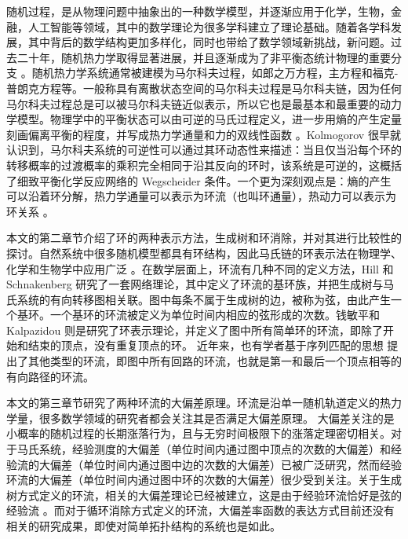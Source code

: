 

随机过程，是从物理问题中抽象出的一种数学模型，并逐渐应用于化学，生物，金融，人工智能等领域，其中的数学理论为很多学科建立了理论基础。随着各学科发展，其中背后的数学结构更加多样化，同时也带给了数学领域新挑战，新问题。过去二十年，随机热力学取得显著进展，并且逐渐成为了非平衡态统计物理的重要分支 \cite{annurev-conmatphys,Seifert_2012,VANDENBROECK20156} 。随机热力学系统通常被建模为马尔科夫过程，如郎之万方程，主方程和福克-普朗克方程等。一般称具有离散状态空间的马尔科夫过程是马尔科夫链，因为任何马尔科夫过程总是可以被马尔科夫链近似表示，所以它也是最基本和最重要的动力学模型。物理学中的平衡状态可以由可逆的马氏过程定义，进一步用熵的产生定量刻画偏离平衡的程度，并写成热力学通量和力的双线性函数 \cite{PhysRev.91.1505}。Kolmogorov \cite{Math.Ann.112} 很早就认识到，马尔科夫系统的可逆性可以通过其环动态性来描述：当且仅当沿每个环的转移概率的过渡概率的乘积完全相同于沿其反向的环时，该系统是可逆的，这概括了细致平衡化学反应网络的 Wegscheider 条件。一个更为深刻观点是：熵的产生可以沿着环分解，热力学通量可以表示为环流（也叫环通量），热动力可以表示为环关系 \cite{Schnakenberg1976NetworkTO}。

本文的第二章节介绍了环的两种表示方法，生成树和环消除，并对其进行比较性的探讨。自然系统中很多随机模型都具有环结构，因此马氏链的环表示法在物理学、化学和生物学中应用广泛 \cite{ZHANG20121,GE201287}。在数学层面上，环流有几种不同的定义方法，Hill \cite{Hill1966StudiesIIa,Hill1966StudiesIIb,hill2013free} 和 Schnakenberg \cite{Schnakenberg1976NetworkTO} 研究了一套网络理论，其中定义了环流的基环族，并把生成树与马氏系统的有向转移图相关联。图中每条不属于生成树的边，被称为弦，由此产生一个基环。一个基环的环流被定义为单位时间内相应的弦形成的次数。钱敏平\cite{minping1982circulation,jian1984circulations,jiang2004mathematical}和 Kalpazidou \cite{kalpazidou2007cycle} 则是研究了环表示理论，并定义了图中所有简单环的环流，即除了开始和结束的顶点，没有重复顶点的环。
近年来，也有学者基于序列匹配的思想 \cite{roldan2019exact,biddle2020reversal,pietzonka2021cycle} 提出了其他类型的环流，即图中所有回路的环流，也就是第一和最后一个顶点相等的有向路径的环流。

本文的第三章节研究了两种环流的大偏差原理。环流是沿单一随机轨道定义的热力学量，很多数学领域的研究者都会关注其是否满足大偏差原理\cite{varadhan1984large,den2000large}。
大偏差关注的是小概率的随机过程的长期涨落行为，且与无穷时间极限下的涨落定理密切相关。对于马氏系统，经验测度的大偏差（单位时间内通过图中顶点的次数的大偏差）和经验流的大偏差（单位时间内通过图中边的次数的大偏差）已被广泛研究，然而经验环流的大偏差（单位时间内通过图中环的次数的大偏差）很少受到关注。关于生成树方式定义的环流，相关的大偏差理论已经被建立，这是由于经验环流恰好是弦的经验流 \cite{bertini2015flows,bertini2015large}。而对于循环消除方式定义的环流，大偏差率函数的表达方式目前还没有相关的研究成果，即使对简单拓扑结构的系统也是如此。

